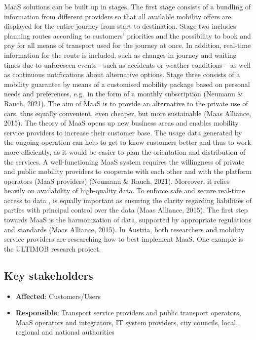 \documentclass[
]{book}
\providecommand{\tightlist}{%
  \setlength{\itemsep}{0pt}\setlength{\parskip}{0pt}}
\begin{document}
MaaS solutions can be built up in stages. The first stage consists of a bundling of information from different providers so that all available mobility offers are displayed for the entire journey from start to destination. Stage two includes planning routes according to customers' priorities and the possibility to book and pay for all means of transport used for the journey at once. In addition, real-time information for the route is included, such as changes in journey and waiting times due to unforeseen events - such as accidents or weather conditions -- as well as continuous notifications about alternative options. Stage three consists of a mobility guarantee by means of a customised mobility package based on personal needs and preferences, e.g.~in the form of a monthly subscription (Neumann \& Rauch, 2021).
The aim of MaaS is to provide an alternative to the private use of cars, thus equally convenient, even cheaper, but more sustainable (Maas Alliance, 2015). The theory of MaaS opens up new business areas and enables mobility service providers to increase their customer base. The usage data generated by the ongoing operation can help to get to know customers better and thus to work more efficiently, as it would be easier to plan the orientation and distribution of the services. A well-functioning MaaS system requires the willingness of private and public mobility providers to cooperate with each other and with the platform operators (MaaS providers) (Neumann \& Rauch, 2021). Moreover, it relies heavily on availability of high-quality data. To enforce safe and secure real-time access to data , is equally important as ensuring the clarity regarding liabilities of parties with principal control over the data (Maas Alliance, 2015). The first step towards MaaS is the harmonization of data, supported by appropriate regulations and standards (Maas Alliance, 2015). In Austria, both researchers and mobility service providers are researching how to best implement MaaS. One example is the ULTIMOB research project.

\hypertarget{key-stakeholders-10}{%
\subsection*{Key stakeholders}\label{key-stakeholders-10}}

\begin{itemize}
\tightlist
\item
  \textbf{Affected}: Customers/Users
\item
  \textbf{Responsible}: Transport service providers and public transport operators, MaaS operators and integrators, IT system providers, city councils, local, regional and national authorities
\end{itemize}
\end{document}
